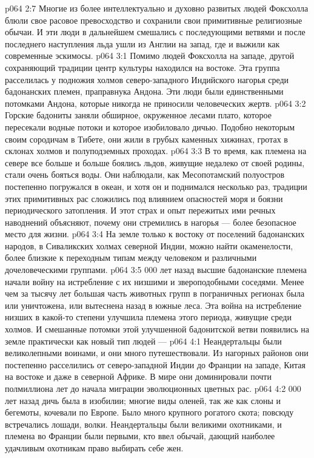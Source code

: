 \vs p064 2:7 Многие из более интеллектуально и духовно развитых людей Фоксхолла блюли свое расовое превосходство и сохранили свои примитивные религиозные обычаи. И эти люди в дальнейшем смешались с последующими ветвями и после последнего наступления льда ушли из Англии на запад, где и выжили как современные эскимосы.
\vs p064 3:1 Помимо людей Фоксхолла на западе, другой сохраняющий традиции центр культуры находился на востоке. Эта группа расселилась у подножия холмов северо\hyp{}западного Индийского нагорья среди бадонанских племен, праправнука Андона. Эти люди были единственными потомками Андона, которые никогда не приносили человеческих жертв.
\vs p064 3:2 Горские бадониты заняли обширное, окруженное лесами плато, которое пересекали водные потоки и которое изобиловало дичью. Подобно некоторым своим сородичам в Тибете, они жили в грубых каменных хижинах, гротах в склонах холмов и полуподземных проходах.
\vs p064 3:3 В то время, как племена на севере все больше и больше боялись льдов, живущие недалеко от своей родины, стали очень бояться воды. Они наблюдали, как Месопотамский полуостров постепенно погружался в океан, и хотя он и поднимался несколько раз, традиции этих примитивных рас сложились под влиянием опасностей моря и боязни периодического затопления. И этот страх и опыт пережитых ими речных наводнений объясняют, почему они стремились в нагорья --- более безопасное место для жизни.
\vs p064 3:4 На земле только к востоку от поселений бадонанских народов, в Сиваликских холмах северной Индии, можно найти окаменелости, более близкие к переходным типам между человеком и различными дочеловеческими группами.
\vs p064 3:5  000 лет назад высшие бадонанские племена начали войну на истребление с их низшими и звероподобными соседями. Менее чем за тысячу лет большая часть животных групп в пограничных регионах была или уничтожена, или вытеснена назад в южные леса. Эта война на истребление низших в какой\hyp{}то степени улучшила племена этого периода, живущие среди холмов. И смешанные потомки этой улучшенной бадонитской ветви появились на земле практически как новый тип людей --- 
\vs p064 4:1 Неандертальцы были великолепными воинами, и они много путешествовали. Из нагорных районов они постепенно расселились от северо\hyp{}западной Индии до Франции на западе, Китая на востоке и даже в северной Африке. В мире они доминировали почти полмиллиона лет до начала миграции эволюционных цветных рас.
\vs p064 4:2  000 лет назад дичь была в изобилии; многие виды оленей, так же как слоны и бегемоты, кочевали по Европе. Было много крупного рогатого скота; повсюду встречались лошади, волки. Неандертальцы были великими охотниками, и племена во Франции были первыми, кто ввел обычай, дающий наиболее удачливым охотникам право выбирать себе жен.
